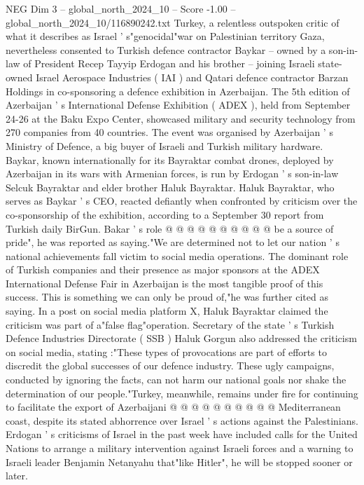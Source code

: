 \begin{textsample}{NEG Dim 3 – global\_north\_2024\_10 – Score -1.00 – global\_north\_2024\_10/116890242.txt}  \label{ex:f3_neg_332}
Turkey, a relentless outspoken critic of what it describes as Israel ' s"genocidal"war on Palestinian territory Gaza, nevertheless consented to Turkish defence contractor Baykar -- owned by a son-in-law of President Recep Tayyip Erdogan and his brother -- joining Israeli state-owned Israel Aerospace Industries ( IAI ) and Qatari defence contractor Barzan Holdings in co-sponsoring a defence exhibition in Azerbaijan.
The 5th edition of Azerbaijan ' s International Defense Exhibition ( ADEX ), held from September 24-26 at the Baku Expo Center, showcased military and security technology from 270 companies from 40 countries.
The event was organised by Azerbaijan ' s Ministry of Defence, a big buyer of Israeli and Turkish military hardware.
Baykar, known internationally for its Bayraktar combat drones, deployed by Azerbaijan in its wars with Armenian forces, is run by Erdogan ' s son-in-law Selcuk Bayraktar and elder brother Haluk Bayraktar.
Haluk Bayraktar, who serves as Baykar ' s CEO, reacted defiantly when confronted by criticism over the co-sponsorship of the exhibition, according to a September 30 report from Turkish daily BirGun.
Bakar ' s role @ @ @ @ @ @ @ @ @ @ be a source of pride", he was reported as saying."We are determined not to let our nation ' s national achievements fall victim to social media operations.
The dominant role of Turkish companies and their presence as major sponsors at the ADEX International Defense Fair in Azerbaijan is the most tangible proof of this success.
This is something we can only be proud of,"he was further cited as saying.
In a post on social media platform X, Haluk Bayraktar claimed the criticism was part of a"false flag"operation.
Secretary of the state ' s Turkish Defence Industries Directorate ( SSB ) Haluk Gorgun also addressed the criticism on social media, stating :"These types of provocations are part of efforts to discredit the global successes of our defence industry.
These ugly campaigns, conducted by ignoring the facts, can not harm our national goals nor shake the determination of our people."Turkey, meanwhile, remains under fire for continuing to facilitate the export of Azerbaijani @ @ @ @ @ @ @ @ @ @ Mediterranean coast, despite its stated abhorrence over Israel ' s actions against the Palestinians.
Erdogan ' s criticisms of Israel in the past week have included calls for the United Nations to arrange a military intervention against Israeli forces and a warning to Israeli leader Benjamin Netanyahu that"like Hitler", he will be stopped sooner or later.

\end{textsample}
